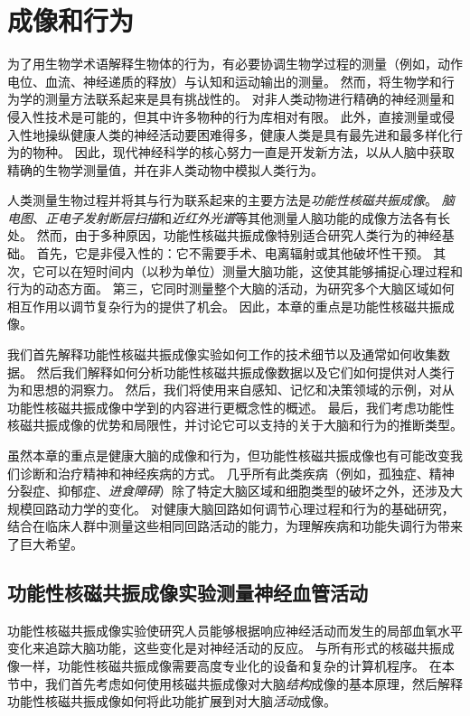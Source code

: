 \chapter{成像和行为} \label{chap:chap6}

为了用生物学术语解释生物体的行为，有必要协调生物学过程的测量（例如，动作电位、血流、神经递质的释放）与认知和运动输出的测量。
然而，将生物学和行为学的测量方法联系起来是具有挑战性的。
对非人类动物进行精确的神经测量和侵入性技术是可能的，但其中许多物种的行为库相对有限。
此外，直接测量或侵入性地操纵健康人类的神经活动要困难得多，健康人类是具有最先进和最多样化行为的物种。
因此，现代神经科学的核心努力一直是开发新方法，以从人脑中获取精确的生物学测量值，并在非人类动物中模拟人类行为。


人类测量生物过程并将其与行为联系起来的主要方法是\textit{功能性核磁共振成像}。
\textit{脑电图}、\textit{正电子发射断层扫描}和\textit{近红外光谱}等其他测量人脑功能的成像方法各有长处。
然而，由于多种原因，功能性核磁共振成像特别适合研究人类行为的神经基础。
首先，它是非侵入性的：它不需要手术、电离辐射或其他破坏性干预。
其次，它可以在短时间内（以秒为单位）测量大脑功能，这使其能够捕捉心理过程和行为的动态方面。
第三，它同时测量整个大脑的活动，为研究多个大脑区域如何相互作用以调节复杂行为的提供了机会。
因此，本章的重点是功能性核磁共振成像。


我们首先解释功能性核磁共振成像实验如何工作的技术细节以及通常如何收集数据。 
然后我们解释如何分析功能性核磁共振成像数据以及它们如何提供对人类行为和思想的洞察力。 
然后，我们将使用来自感知、记忆和决策领域的示例，对从功能性核磁共振成像中学到的内容进行更概念性的概述。
最后，我们考虑功能性核磁共振成像的优势和局限性，并讨论它可以支持的关于大脑和行为的推断类型。


虽然本章的重点是健康大脑的成像和行为，但功能性核磁共振成像也有可能改变我们诊断和治疗精神和神经疾病的方式。
几乎所有此类疾病（例如，孤独症、精神分裂症、抑郁症、\textit{进食障碍}）除了特定大脑区域和细胞类型的破坏之外，还涉及大规模回路动力学的变化。
对健康大脑回路如何调节心理过程和行为的基础研究，结合在临床人群中测量这些相同回路活动的能力，为理解疾病和功能失调行为带来了巨大希望。



\section{功能性核磁共振成像实验测量神经血管活动}

功能性核磁共振成像实验使研究人员能够根据响应神经活动而发生的局部血氧水平变化来追踪大脑功能，这些变化是对神经活动的反应。
与所有形式的核磁共振成像一样，功能性核磁共振成像需要高度专业化的设备和复杂的计算机程序。
在本节中，我们首先考虑如何使用核磁共振成像对大脑\textit{结构}成像的基本原理，然后解释功能性核磁共振成像如何将此功能扩展到对大脑\textit{活动}成像。


